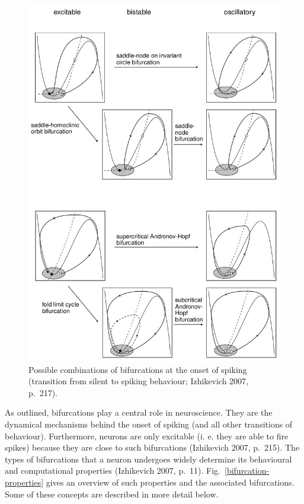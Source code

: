 \documentclass[12pt,a4paper,]{report}
\begin{document}
\begin{figure}
\centering
\includegraphics[]{images/bifurcation-combinations.jpg}
\caption[Possible combinations of bifurcations at the onset of
spiking]{Possible combinations of bifurcations at the onset of
spiking (transition from silent to spiking behaviour; Izhikevich
2007, p.~217).}\label{bifurcation-combinations}
\end{figure}

As outlined, bifurcations play a central role in neuroscience. They are
the dynamical mechanisms behind the onset of spiking (and all other
transitions of behaviour). Furthermore, neurons are only excitable (i.
e. they are able to fire spikes) because they are close to such
bifurcations (Izhikevich 2007, p.~215). The types of bifurcations that a
neuron undergoes widely determine its behavioural and computational
properties (Izhikevich 2007, p.~11). Fig.~\ref{bifurcation-properties}
gives an overview of such properties and the associated bifurcations.
Some of these concepts are described in more detail below.
\end{document}
